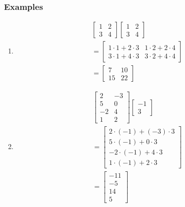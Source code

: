 \documentclass[
  letterpaper,
  DIV=11,
  numbers=noendperiod]{scrartcl}
\begin{document}
\hypertarget{examples}{%
\subsubsection{Examples}\label{examples}}

\begin{enumerate}
\def\labelenumi{\arabic{enumi}.}
\item
  \begin{align*}
  &\begin{bmatrix} 1 & 2 \\ 3 & 4\end{bmatrix}\begin{bmatrix} 1 & 2 \\ 3 & 4 \end{bmatrix} \\
  &= \begin{bmatrix} 1 \cdot 1 + 2 \cdot 3 & 1 \cdot 2 + 2 \cdot 4 \\ 3 \cdot 1 + 4 \cdot 3 & 3 \cdot 2 + 4 \cdot 4 \end{bmatrix} \\
  &= \begin{bmatrix} 7 & 10 \\ 15 & 22 \end{bmatrix}
  \end{align*}
\item
  \begin{align*}
  &\begin{bmatrix}2 & -3 \\ 5 & 0 \\ -2 & 4 \\ 1 & 2 \end{bmatrix}\begin{bmatrix}-1 \\ 3 \end{bmatrix} \\
  &=\begin{bmatrix} 2 \cdot (-1) + (-3) \cdot 3 \\ 5 \cdot (-1) + 0 \cdot 3 \\ -2 \cdot (-1) + 4 \cdot 3 \\ 1 \cdot (-1) + 2 \cdot 3 \end{bmatrix} \\
  &=\begin{bmatrix} -11 \\ -5 \\ 14 \\ 5 \end{bmatrix}
  \end{align*}

\end{enumerate}
\end{document}
